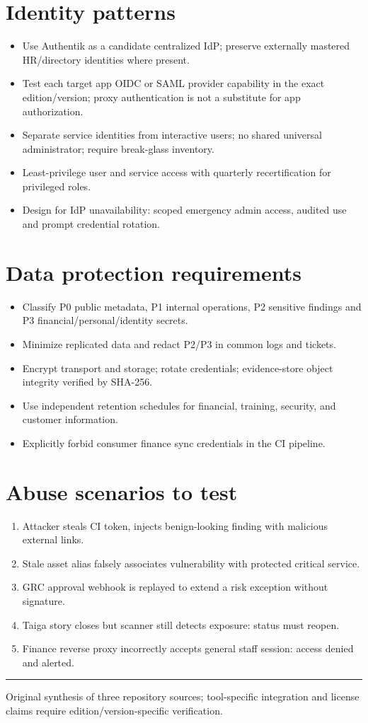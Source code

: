 \documentclass[10pt,letterpaper]{article}
\begin{document}
\section{Identity patterns}
\begin{itemize}
\item Use Authentik as a candidate centralized IdP; preserve externally mastered HR/directory identities where present.
\item Test each target app OIDC or SAML provider capability in the exact edition/version; proxy authentication is not a substitute for app authorization.
\item Separate service identities from interactive users; no shared universal administrator; require break-glass inventory.
\item Least-privilege user and service access with quarterly recertification for privileged roles.
\item Design for IdP unavailability: scoped emergency admin access, audited use and prompt credential rotation.
\end{itemize}
\section{Data protection requirements}
\begin{itemize}
\item Classify P0 public metadata, P1 internal operations, P2 sensitive findings and P3 financial/personal/identity secrets.
\item Minimize replicated data and redact P2/P3 in common logs and tickets.
\item Encrypt transport and storage; rotate credentials; evidence-store object integrity verified by SHA-256.
\item Use independent retention schedules for financial, training, security, and customer information.
\item Explicitly forbid consumer finance sync credentials in the CI pipeline.
\end{itemize}
\section{Abuse scenarios to test}
\begin{enumerate}
\item Attacker steals CI token, injects benign-looking finding with malicious external links.
\item Stale asset alias falsely associates vulnerability with protected critical service.
\item GRC approval webhook is replayed to extend a risk exception without signature.
\item Taiga story closes but scanner still detects exposure: status must reopen.
\item Finance reverse proxy incorrectly accepts general staff session: access denied and alerted.
\end{enumerate}
\vfill\noindent\color{muted}\rule{\linewidth}{0.4pt}\par\scriptsize Original synthesis of three repository sources; tool-specific integration and license claims require edition/version-specific verification.\normalsize
\end{document}
